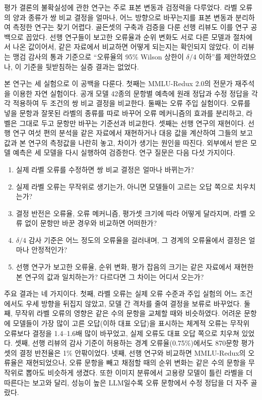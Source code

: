 \documentclass[11pt]{article}
\begin{document}
평가 결론의 불확실성에 관한 연구는 주로 표본 변동과 검정력을 다루었다\citep{card-etal-2020-little,madaan2024variance}. 라벨 오류의 양과 종류가 쌍 비교 결정을 얼마나, 어느 방향으로 바꾸는지를 표본 변동과 분리하여 측정한 연구는 찾기 어렵다. 골든셋의 구축과 검증을 다룬 선행 리뷰\citep{anonymous2026review}도 이를 연구 공백으로 꼽았다. 선행 연구들이 보고한 오류율과 순위 변화도 서로 다른 모델과 절차에서 나온 값이어서, 같은 자료에서 비교하면 어떻게 되는지는 확인되지 않았다. 이 리뷰는 맹검 감사의 통과 기준으로 ``오류율의 95\% Wilson 상한이 $\delta/4$ 이하''를 제안하였으나, 이 기준을 뒷받침하는 실증 결과는 없었다.

본 연구는 세 실험으로 이 공백을 다룬다. 첫째는 MMLU-Redux 2.0의 전문가 재주석을 이용한 자연 실험이다. 공개 모델 42종의 문항별 예측에 원래 정답과 수정 정답을 각각 적용하여 두 조건의 쌍 비교 결정을 비교한다. 둘째는 오류 주입 실험이다. 오류를 넣을 문항과 잘못된 라벨의 종류를 따로 바꾸어 오류 메커니즘의 효과를 분리하고, 라벨은 그대로 두고 문항만 바꾸는 기준선과 비교한다. 셋째는 선행 연구의 재현이다. 선행 연구 여섯 편의 분석을 같은 자료에서 재현하거나 대응 값을 계산하여 그들의 보고값과 본 연구의 측정값을 나란히 놓고, 차이가 생기는 원인을 따진다. 외부에서 받은 모델 예측은 세 모델을 다시 실행하여 검증한다. 연구 질문은 다음 다섯 가지이다.

\begin{enumerate}[label=\textbf{RQ\arabic*.}, leftmargin=*, itemsep=1pt, topsep=3pt]
\item 실제 라벨 오류를 수정하면 쌍 비교 결정은 얼마나 바뀌는가?
\item 실제 라벨 오류는 무작위로 생기는가, 아니면 모델들이 고르는 오답 쪽으로 치우치는가?
\item 결정 반전은 오류율, 오류 메커니즘, 평가셋 크기에 따라 어떻게 달라지며, 라벨 오류 없이 문항만 바꾼 경우와 비교하면 어떠한가?
\item $\delta/4$ 감사 기준은 어느 정도의 오류율을 걸러내며, 그 경계의 오류율에서 결정은 얼마나 안정적인가?
\item 선행 연구가 보고한 오류율, 순위 변화, 평가 잡음의 크기는 같은 자료에서 재현한 본 연구의 값과 일치하는가? 다르다면 그 차이는 어디서 오는가?
\end{enumerate}

주요 결과는 네 가지이다. 첫째, 라벨 오류는 실제 오류 수준과 주입 실험의 어느 조건에서도 우세 방향을 뒤집지 않았고, 모델 간 격차를 줄여 결정을 보류로 바꾸었다. 둘째, 무작위 라벨 오류의 영향은 같은 수의 문항을 교체할 때와 비슷하였다. 어려운 문항에 모델들이 가장 많이 고른 오답(이하 대표 오답)을 표시하는 체계적 오류는 무작위 오류보다 결정을 1.4--1.6배 많이 바꾸었고, 실제 오류도 대표 오답 쪽으로 치우쳐 있었다. 셋째, 선행 리뷰의 감사 기준이 허용하는 경계 오류율(0.75\%)에서도 870문항 평가셋의 결정 반전율은 1\% 안팎이었다. 넷째, 선행 연구와 비교하면 MMLU-Redux의 오류율은 재현되었으나, 오류 문항을 빼고 채점할 때의 순위 변화는 같은 수의 문항을 무작위로 뽑아도 비슷하게 생겼다. 또한 이미지 분류에서 고용량 모델이 틀린 라벨을 더 따른다는 보고와 달리, 성능이 높은 LLM일수록 오류 문항에서 수정 정답을 더 자주 골랐다.
\end{document}
